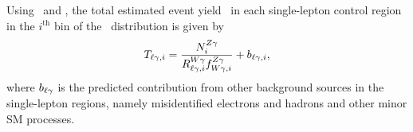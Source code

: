 Using \RWl\ and \fZW, the total estimated event yield \Tl\ in each single-lepton control region in the $i^\mathrm{th}$ bin of the \ETg\ distribution is given by
\begin{equation}
  \Tl[,i] = \frac{\NZg[i]}{\RWl[,i]\fZW[,i]} + b_{\ell\Pgg,i},
\end{equation}
where $b_{\ell\Pgg}$ is the predicted contribution from other background sources in the single-lepton regions, namely misidentified electrons and hadrons and other minor SM processes.
